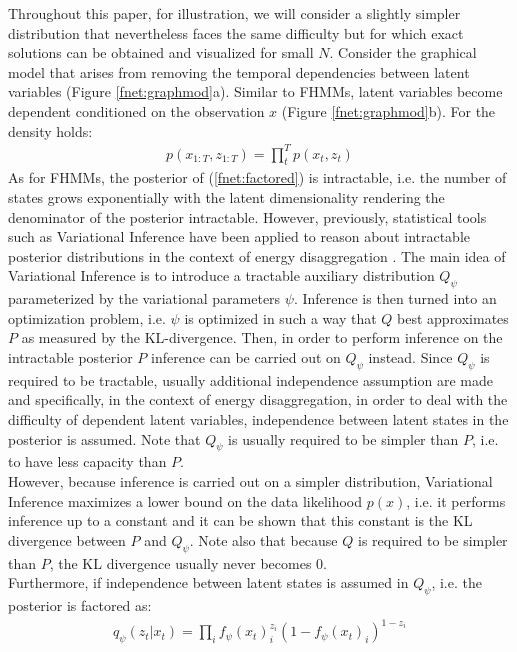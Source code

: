 Throughout this paper, for illustration, we will consider a slightly simpler distribution that nevertheless faces the same difficulty but for which exact solutions can be obtained and visualized for small $N$. Consider the graphical model that arises from removing the temporal dependencies between latent variables (Figure \ref{fnet:graphmod}a). Similar to FHMMs, latent variables become dependent conditioned on the observation $x$ (Figure \ref{fnet:graphmod}b). For the density holds: 
\begin{align}
p(x_{1:T},z_{1:T}) = \prod_t^T p(x_t, z_t) \label{fnet:factored}
\end{align}
As for FHMMs, the posterior of (\ref{fnet:factored}) is intractable, i.e. the number of states grows exponentially with the latent dimensionality rendering the denominator of the posterior intractable. However, previously, statistical tools such as Variational Inference \cite{jordan1999introduction} have been applied to reason about intractable posterior distributions in the context of energy disaggregation \cite{ng2016scaling,lange2016varbolt}. The main idea of Variational Inference is to introduce a tractable auxiliary distribution $Q_\psi$ parameterized by the variational parameters $\psi$. Inference is then turned into an optimization problem, i.e. $\psi$ is optimized in such a way that $Q$ best approximates $P$ as measured by the KL-divergence. Then, in order to perform inference on the intractable posterior $P$ inference can be carried out on $Q_\psi$ instead. Since $Q_\psi$ is required to be tractable, usually additional independence assumption are made and specifically, in the context of energy disaggregation, in order to deal with the difficulty of dependent latent variables, independence between latent states in the posterior is assumed. Note that $Q_\psi$ is usually required to be simpler than $P$, i.e. to have less capacity than $P$.\\
However, because inference is carried out on a simpler distribution, Variational Inference maximizes a lower bound on the data likelihood $p(x)$, i.e. it performs inference up to a constant and it can be shown that this constant is the KL divergence between $P$ and $Q_\psi$. Note also that because $Q$ is required to be simpler than $P$, the KL divergence usually never becomes 0.\\
Furthermore, if independence between latent states is assumed in $Q_\psi$, i.e. the posterior is factored as:
\begin{align}
q_\psi(z_{t}|x_{t}) = \prod_i f_\psi(x_t)_i^{z_i}(1-f_\psi(x_t)_i)^{1-z_i} \label{fnet:aux_dist}
\end{align}
